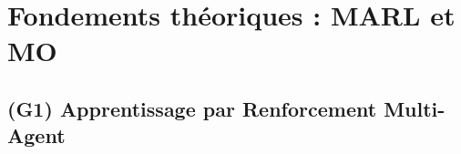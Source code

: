 

\section{Fondements théoriques : MARL et MO}



\subsection{(G1) Apprentissage par Renforcement Multi-Agent}









